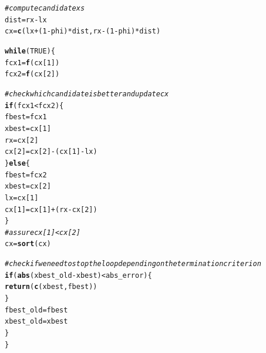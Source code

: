 \documentclass[a4paper]{article}
\makeatletter
\newcommand{\hlnum}[1]{\textcolor[rgb]{0.686,0.059,0.569}{#1}}%
\newcommand{\hlcom}[1]{\textcolor[rgb]{0.678,0.584,0.686}{\textit{#1}}}%
\newcommand{\hlopt}[1]{\textcolor[rgb]{0,0,0}{#1}}%
\newcommand{\hlstd}[1]{\textcolor[rgb]{0.345,0.345,0.345}{#1}}%
\newcommand{\hlkwa}[1]{\textcolor[rgb]{0.161,0.373,0.58}{\textbf{#1}}}%
\newcommand{\hlkwb}[1]{\textcolor[rgb]{0.69,0.353,0.396}{#1}}%
\newcommand{\hlkwd}[1]{\textcolor[rgb]{0.737,0.353,0.396}{\textbf{#1}}}%
\newenvironment{kframe}{%
 \def\at@end@of@kframe{}%
 \ifinner\ifhmode%
  \def\at@end@of@kframe{\end{minipage}}%
  \begin{minipage}{\columnwidth}%
 \fi\fi%
 \def\FrameCommand##1{\hskip\@totalleftmargin \hskip-\fboxsep
 \colorbox{shadecolor}{##1}\hskip-\fboxsep
     \hskip-\linewidth \hskip-\@totalleftmargin \hskip\columnwidth}%
 \MakeFramed {\advance\hsize-\width
   \@totalleftmargin\z@ \linewidth\hsize
   \@setminipage}}%
 {\par\unskip\endMakeFramed%
 \at@end@of@kframe}
\newenvironment{knitrout}{}{} %
\makeatother
\begin{document}
{\begin{enumerate}
\begin{knitrout}
\begin{kframe}
\begin{alltt}
  \hlcom{# compute candidate xs}
  \hlstd{dist} \hlkwb{=} \hlstd{rx} \hlopt{-} \hlstd{lx}
  \hlstd{cx} \hlkwb{=} \hlkwd{c}\hlstd{(lx} \hlopt{+} \hlstd{(}\hlnum{1}\hlopt{-}\hlstd{phi)} \hlopt{*} \hlstd{dist, rx} \hlopt{-} \hlstd{(}\hlnum{1}\hlopt{-}\hlstd{phi)} \hlopt{*} \hlstd{dist)}

  \hlkwa{while}\hlstd{(}\hlnum{TRUE}\hlstd{)\{}
    \hlstd{fcx1} \hlkwb{=} \hlkwd{f}\hlstd{(cx[}\hlnum{1}\hlstd{])}
    \hlstd{fcx2} \hlkwb{=} \hlkwd{f}\hlstd{(cx[}\hlnum{2}\hlstd{])}

    \hlcom{# check which candidate is better and update cx}
    \hlkwa{if} \hlstd{(fcx1} \hlopt{<} \hlstd{fcx2)\{}
      \hlstd{fbest} \hlkwb{=} \hlstd{fcx1}
      \hlstd{xbest} \hlkwb{=} \hlstd{cx[}\hlnum{1}\hlstd{]}
      \hlstd{rx} \hlkwb{=} \hlstd{cx[}\hlnum{2}\hlstd{]}
      \hlstd{cx[}\hlnum{2}\hlstd{]} \hlkwb{=} \hlstd{cx[}\hlnum{2}\hlstd{]} \hlopt{-} \hlstd{(cx[}\hlnum{1}\hlstd{]} \hlopt{-} \hlstd{lx)}
    \hlstd{\}}\hlkwa{else}\hlstd{\{}
      \hlstd{fbest} \hlkwb{=} \hlstd{fcx2}
      \hlstd{xbest} \hlkwb{=} \hlstd{cx[}\hlnum{2}\hlstd{]}
      \hlstd{lx} \hlkwb{=} \hlstd{cx[}\hlnum{1}\hlstd{]}
      \hlstd{cx[}\hlnum{1}\hlstd{]} \hlkwb{=} \hlstd{cx[}\hlnum{1}\hlstd{]} \hlopt{+} \hlstd{(rx} \hlopt{-} \hlstd{cx[}\hlnum{2}\hlstd{])}
    \hlstd{\}}
    \hlcom{# assure cx[1] < cx[2]}
    \hlstd{cx} \hlkwb{=} \hlkwd{sort}\hlstd{(cx)}

    \hlcom{# check if we need to stop the loop depending on the termination criterion}
    \hlkwa{if} \hlstd{(}\hlkwd{abs}\hlstd{(xbest_old} \hlopt{-} \hlstd{xbest)} \hlopt{<} \hlstd{abs_error)\{}
      \hlkwd{return}\hlstd{(}\hlkwd{c}\hlstd{(xbest, fbest))}
    \hlstd{\}}
    \hlstd{fbest_old} \hlkwb{=} \hlstd{fbest}
    \hlstd{xbest_old} \hlkwb{=} \hlstd{xbest}
  \hlstd{\}}
\hlstd{\}}


\end{alltt}
\end{kframe}
\end{knitrout}
\end{enumerate}}
\end{document}
